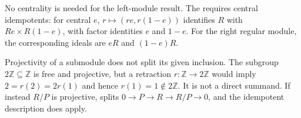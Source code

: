 \begin{remark}\label{remark-central-and-sidedness}
No centrality is needed for the left-module result. The  requires central idempotents: for central $e$, $r\mapsto(re,r(1-e))$ identifies $R$ with $Re\times R(1-e)$, with factor identities $e$ and $1-e$. For the right regular module, the corresponding ideals are $eR$ and $(1-e)R$.
\end{remark}

\begin{example}\label{ex-projective-submodule-not-summand}
Projectivity of a submodule does not split its given inclusion. The subgroup $2\mathbb Z\subseteq\mathbb Z$ is free and projective, but a retraction $r:\mathbb Z\to2\mathbb Z$ would imply $2=r(2)=2r(1)$ and hence $r(1)=1\notin2\mathbb Z$. It is not a direct summand. If instead $R/P$ is projective,  splits $0\to P\to R\to R/P\to0$, and the idempotent description does apply.
\end{example}
